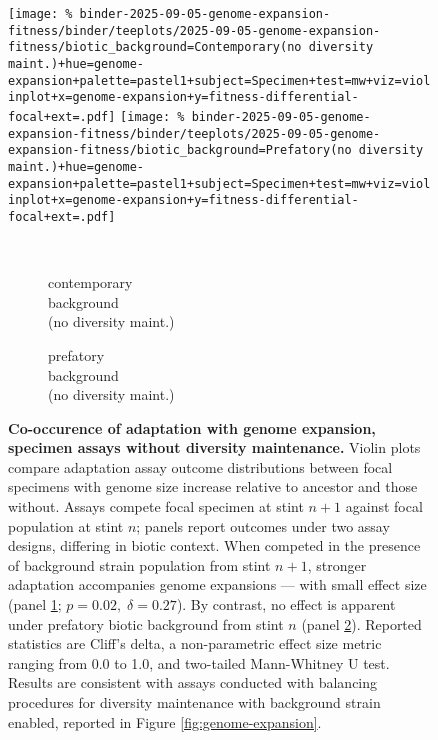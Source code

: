\begin{figure}

\texttt{[image: \%
binder-2025-09-05-genome-expansion-fitness/binder/teeplots/2025-09-05-genome-expansion-fitness/biotic\_background=Contemporary(no diversity maint.)+hue=genome-expansion+palette=pastel1+subject=Specimen+test=mw+viz=violinplot+x=genome-expansion+y=fitness-differential-focal+ext=.pdf]}
\texttt{[image: \%
binder-2025-09-05-genome-expansion-fitness/binder/teeplots/2025-09-05-genome-expansion-fitness/biotic\_background=Prefatory(no diversity maint.)+hue=genome-expansion+palette=pastel1+subject=Specimen+test=mw+viz=violinplot+x=genome-expansion+y=fitness-differential-focal+ext=.pdf]}%

\vspace{-1ex}

\begin{subfigure}{0.135\linewidth}
~
\end{subfigure}%
\begin{subfigure}{0.405\linewidth}
    \centering
    \caption{\footnotesize contemporary\\background\\(no diversity maint.)}
    \label{fig:genome-expansion-nodmaint:contemporary}
\end{subfigure}%
\begin{subfigure}{0.405\linewidth}
    \centering
    \caption{\footnotesize prefatory\\background\\(no diversity maint.)}
    \label{fig:genome-expansion-nodmaint:prefatory}
\end{subfigure}%

\caption{
    \textbf{Co-occurence of adaptation with genome expansion, specimen assays without diversity maintenance.}
    \footnotesize
    Violin plots compare adaptation assay outcome distributions between focal specimens with genome size increase relative to ancestor and those without.
    Assays compete focal specimen at stint $n+1$ against focal population at stint $n$;
    panels report outcomes under two assay designs, differing in biotic context.
    When competed in the presence of background strain population from stint $n+1$, stronger adaptation accompanies genome expansions --- with small effect size (panel \ref{fig:genome-expansion-nodmaint:contemporary}; $p = 0.02, \; \delta = 0.27$).
    By contrast, no effect is apparent under prefatory biotic background from stint $n$ (panel \ref{fig:genome-expansion-nodmaint:prefatory}).
    Reported statistics are Cliff's delta, a non-parametric effect size metric ranging from 0.0 to 1.0, and two-tailed Mann-Whitney U test.
    Results are consistent with assays conducted with balancing procedures for diversity maintenance with background strain enabled, reported in Figure \ref{fig:genome-expansion}.
}
\label{fig:genome-expansion-nodmaint}

\end{figure}

